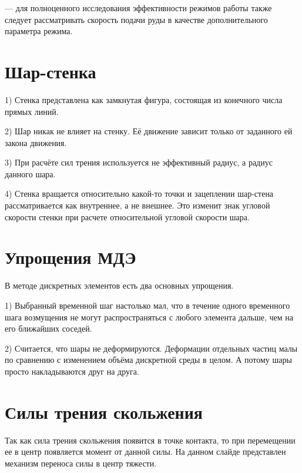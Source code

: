 \documentclass[a4paper]{article}
\begin{document}
	--- для полноценного исследования эффективности режимов работы также следует рассматривать скорость подачи руды в качестве дополнительного параметра режима.


\section{Шар-стенка}

1) Стенка представлена как замкнутая фигура, состоящая из конечного числа прямых линий.

2) Шар никак не влияет на стенку. 
Её движение зависит только от заданного ей закона движения.

3) При расчёте сил трения используется не эффективный радиус, а радиус данного шара.

4) Стенка вращается относительно какой-то точки и зацеплении шар-стена рассматривается как внутреннее, а не внешнее. 
Это изменит знак угловой скорости стенки при расчете относительной угловой скорости шара.


\section{Упрощения МДЭ}

В методе дискретных элементов есть два основных упрощения.

1) Выбранный временной шаг настолько мал, что в течение одного временного шага возмущения не могут распространяться с любого элемента дальше, чем на его ближайших соседей. 

2) Считается, что шары не деформируются.
Деформации отдельных частиц малы по сравнению с изменением объёма дискретной среды в целом.
А потому шары просто накладываются друг на друга.

\section{Силы трения скольжения}

Так как сила трения скольжения появится в точке контакта, то при перемещении ее в центр появляется момент от данной силы.
На данном слайде представлен механизм переноса силы в центр тяжести.
\end{document}
